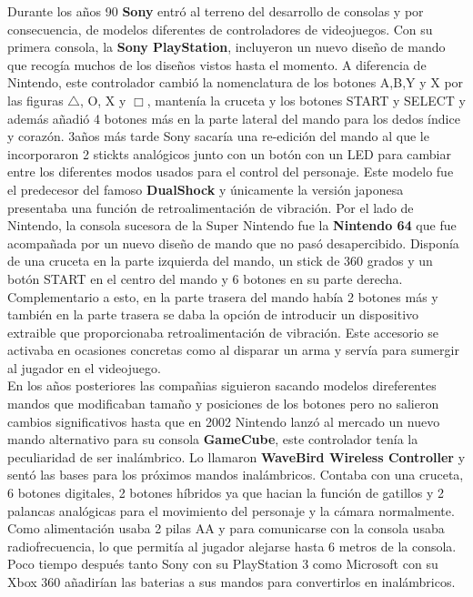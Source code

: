 Durante los a\~nos 90 \textbf{Sony} entr\'o al terreno del desarrollo de consolas y por consecuencia, de modelos diferentes de controladores de videojuegos. Con su primera consola, la \textbf{Sony PlayStation}, incluyeron un nuevo dise\~no de mando que recog\'ia muchos de los dise\~nos vistos hasta el momento. A diferencia de Nintendo, este controlador cambi\'o la nomenclatura de los botones A,B,Y y X por las figuras $\triangle$, O, X y $\Box$, manten\'ia la cruceta y los botones START y SELECT y adem\'as a\~nadi\'o 4 botones m\'as en la parte lateral del mando para los dedos \'indice y coraz\'on. 3a\~nos m\'as tarde Sony sacar\'ia una re-edici\'on del mando al que le incorporaron 2 stickts anal\'ogicos junto con un bot\'on con un LED para cambiar entre los diferentes modos usados para el control del personaje. Este modelo fue el predecesor del famoso \textbf{DualShock} y \'unicamente la versi\'on japonesa presentaba una funci\'on de retroalimentaci\'on de vibraci\'on. Por el lado de Nintendo, la consola sucesora de la Super Nintendo fue la \textbf{Nintendo 64} que fue acompa\~nada por un nuevo dise\~no de mando que no pas\'o desapercibido. Dispon\'ia de una cruceta en la parte izquierda del mando, un stick de 360 grados y un bot\'on START en el centro del mando y 6 botones en su parte derecha. Complementario a esto, en la parte trasera del mando hab\'ia 2 botones m\'as y tambi\'en en la parte trasera se daba la opci\'on de introducir un dispositivo extraible que proporcionaba retroalimentaci\'on de vibraci\'on. Este accesorio se activaba en ocasiones concretas como al disparar un arma y serv\'ia para sumergir al jugador en el videojuego.\\

En los a\~nos posteriores las compa\~nias siguieron sacando modelos direferentes mandos que modificaban tama\~no y posiciones de los botones pero no salieron cambios significativos hasta que en 2002 Nintendo lanz\'o al mercado un nuevo mando alternativo para su consola \textbf{GameCube}, este controlador ten\'ia la peculiaridad de ser inal\'ambrico. Lo llamaron \textbf{WaveBird Wireless Controller} y sent\'o las bases para los pr\'oximos mandos inal\'ambricos. Contaba con una cruceta, 6 botones digitales, 2 botones h\'ibridos ya que hacian la funci\'on de gatillos y 2 palancas anal\'ogicas para el movimiento del personaje y la c\'amara normalmente. Como alimentaci\'on usaba 2 pilas AA y para comunicarse con la consola usaba radiofrecuencia, lo que permit\'ia al jugador alejarse hasta 6 metros de la consola. Poco tiempo despu\'es tanto Sony con su PlayStation 3 como Microsoft con su Xbox 360 a\~nadir\'ian las baterias a sus mandos para convertirlos en inal\'ambricos. \\

